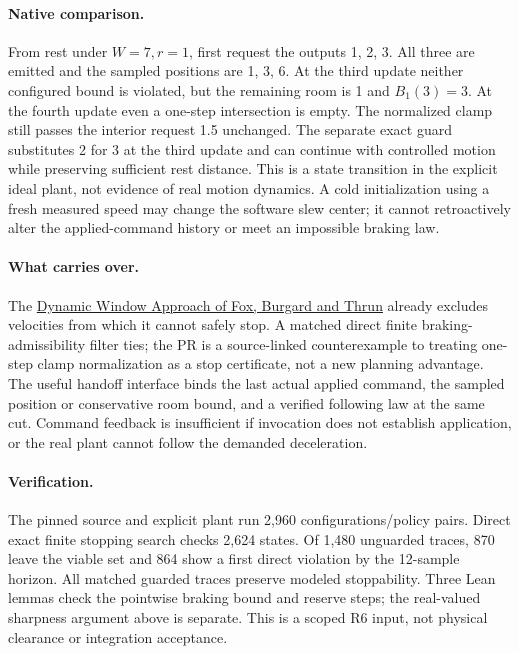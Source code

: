 \documentclass{article}
\begin{document}
\paragraph{Native comparison.}
From rest under $W=7,r=1$, first request the outputs 1, 2, 3.
All three are emitted and the sampled positions are 1, 3, 6.
At the third update neither configured bound is violated, but the
remaining room is 1 and $B_1(3)=3$. At the fourth update even a
one-step intersection is empty. The normalized clamp still passes
the interior request 1.5 unchanged. The separate exact guard
substitutes 2 for 3 at the third update and can continue with
controlled motion while preserving sufficient rest distance. This
is a state transition in the explicit ideal plant, not evidence of
real motion dynamics. A cold initialization using a fresh measured
speed may change the software slew center; it cannot retroactively
alter the applied-command history or meet an impossible braking law.

\paragraph{What carries over.}
The \href{https://doi.org/10.1109/100.580977}{Dynamic Window
Approach of Fox, Burgard and Thrun} already excludes velocities from
which it cannot safely stop. A matched direct finite
braking-admissibility filter ties; the PR is a source-linked
counterexample to treating one-step clamp normalization as a stop
certificate, not a new planning advantage. The useful handoff
interface binds the last actual applied command, the sampled position
or conservative room bound, and a verified following law at the
same cut. Command feedback is insufficient if invocation does not
establish application, or the real plant cannot follow the demanded
deceleration.

\paragraph{Verification.}
The pinned source and explicit plant run 2,960 configurations/policy
pairs. Direct exact finite stopping search checks 2,624 states.
Of 1,480 unguarded traces, 870 leave the viable set and 864
show a first direct violation by the 12-sample horizon. All matched
guarded traces preserve modeled stoppability. Three Lean lemmas
check the pointwise braking bound and reserve steps; the real-valued
sharpness argument above is separate. This is a scoped R6 input,
not physical clearance or integration acceptance.
\end{document}
